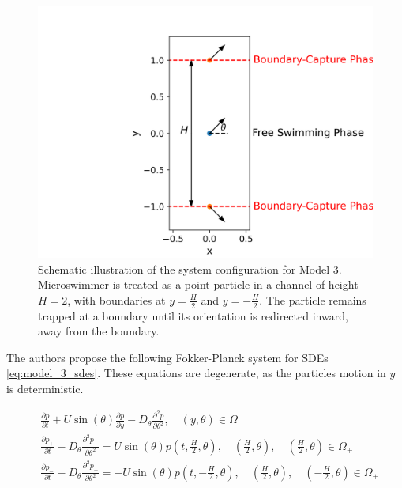 \begin{figure}[htbp]
    \centering
    \includegraphics[scale=0.5]{graphics/model_3_setup.png}
    \caption{Schematic illustration of the system configuration for Model 3. Microswimmer is 
    treated as a point particle in a channel of height $H=2$, with boundaries at
    $y=\frac{H}{2}$ and $y=-\frac{H}{2}$. The particle remains trapped at a boundary until 
    its orientation is redirected inward, away from the boundary.}
    \label{fig:model_3_setup}
\end{figure}

The authors propose the following Fokker-Planck system for SDEs \eqref{eq:model_3_sdes}. 
These equations are degenerate, as the particles motion in $y$ is deterministic.

\begin{subequations}\label{eq:model_3_fk}
    \begin{align}
        & \frac{\partial p}{\partial t} + U \sin(\theta) \frac{\partial p}{\partial y} - D_\theta \frac{\partial^2 p}{\partial \theta^2}, \quad (y, \theta) \in \Omega \label{eq:fsp_sde} \\
        & \frac{\partial p_+}{\partial t} - D_\theta \frac{\partial^2 p_+}{\partial \theta^2} = U \sin(\theta)p(t, \frac{H}{2}, \theta), \quad (\frac{H}{2}, \theta), \quad (\frac{H}{2}, \theta) \in \Omega_+ \label{eq:bcp_sde_up}\\
        & \frac{\partial p_-}{\partial t} - D_\theta \frac{\partial^2 p_+}{\partial \theta^2} = -U \sin(\theta)p(t, -\frac{H}{2}, \theta), \quad (\frac{H}{2}, \theta), \quad (-\frac{H}{2}, \theta) \in \Omega_+ \label{eq:bcp_sde_down}
    \end{align}
\end{subequations}

